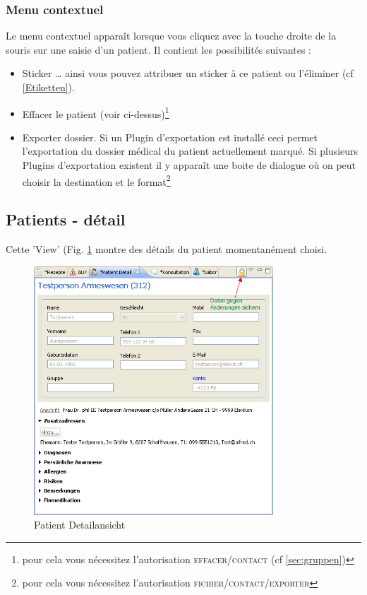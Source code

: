 \subsubsection{Menu contextuel}
Le menu contextuel apparaît lorsque vous cliquez avec la touche droite de la souris sur une saisie d'un patient. Il contient les possibilités suivantes :
\begin{itemize}
    \item Sticker … ainsi vous pouvez attribuer un sticker à ce patient ou l'éliminer (cf \ref{Etiketten}).
  \item Effacer le patient (voir ci-dessus)\footnote{pour cela vous nécessitez l'autorisation \textsc{effacer/contact} (cf \ref{sec:gruppen})}
  \item Exporter dossier. Si un Plugin d'exportation est installé ceci permet l'exportation du dossier médical du patient actuellement marqué. Si plusieurs Plugins d'exportation existent il y apparaît une boite de dialogue où on peut choisir la destination et le format\footnote{pour cela vous nécessitez l'autorisation \textsc{fichier/contact/exporter}}
\end{itemize}


\subsection{Patients - détail}
Cette 'View' (Fig. \ref{fig:patdetail} montre des détails du patient momentanément choisi. 

\begin{figure}[t]
\centering
  \includegraphics[width=0.8\textwidth]{images/patdetail}
  \caption{Patient Detailansicht}
  \label{fig:patdetail}
  \hfill

\end{figure}

